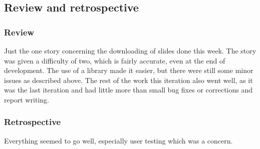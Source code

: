 \subsection{Review and retrospective}
\subsubsection{Review}
Just the one story concerning the downloading of slides done this week. The story was given a difficulty of two, which is fairly accurate, even at the end of development. The use of a library made it easier, but there were still some minor issues as described above. The rest of the work this iteration also went well, as it was the last iteration and had little more than small bug fixes or corrections and report writing.
\subsubsection{Retrospective}
Everything seemed to go well, especially user testing which was a concern.
\newpage
